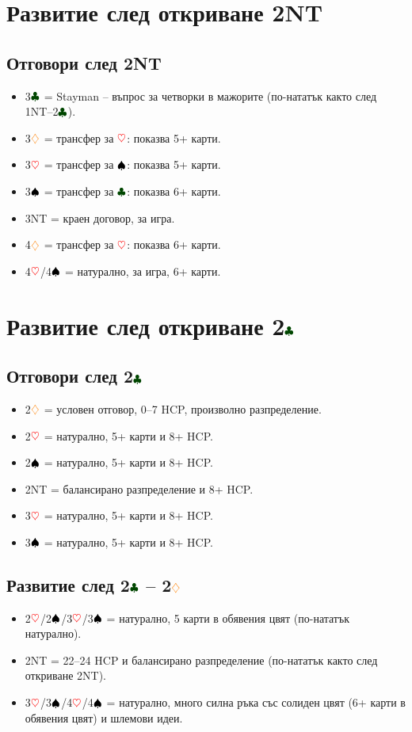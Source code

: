 \documentclass[10pt,a5paper]{extarticle}
\newcommand{\Rheart}{\textcolor{red}{\heartsuit}}
\newcommand{\Rdiamond}{\textcolor{orange}{\diamondsuit}}
\newcommand{\Bspade}{\textcolor{black}{\spadesuit}}
\newcommand{\Bclub}{\textcolor{darkgreen}{\clubsuit}}
\begin{document}
\section{Развитие след откриване 2NT}

\subsection*{Отговори след 2NT}
\begin{itemize}
  \item[] 3$\Bclub$ = Stayman – въпрос за четворки в мажорите  
  (по-нататък както след 1NT–2$\Bclub$).
  \item[] 3$\Rdiamond$ = трансфер за $\Rheart$: показва 5+ карти.
  \item[] 3$\Rheart$ = трансфер за $\Bspade$: показва 5+ карти.
  \item[] 3$\Bspade$ = трансфер за $\Bclub$: показва 6+ карти.
  \item[] 3NT = краен договор, за игра.
  \item[] 4$\Rdiamond$ = трансфер за $\Rheart$: показва 6+ карти.
  \item[] 4$\Rheart$/4$\Bspade$ = натурално, за игра, 6+ карти.
\end{itemize}

\section{Развитие след откриване 2$\Bclub$}

\subsection*{Отговори след 2$\Bclub$}
\begin{itemize}
  \item[] 2$\Rdiamond$ = условен отговор, 0–7 HCP, произволно разпределение.
  \item[] 2$\Rheart$ = натурално, 5+ карти и 8+ HCP.
  \item[] 2$\Bspade$ = натурално, 5+ карти и 8+ HCP.
  \item[] 2NT = балансирано разпределение и 8+ HCP.
  \item[] 3$\Rheart$ = натурално, 5+ карти и 8+ HCP.
  \item[] 3$\Bspade$ = натурално, 5+ карти и 8+ HCP.
\end{itemize}

\subsection*{Развитие след 2$\Bclub$ – 2$\Rdiamond$}
\begin{itemize}
  \item[] 2$\Rheart$/2$\Bspade$/3$\Rheart$/3$\Bspade$ = натурално, 5 карти в обявения цвят (по-нататък натурално).
  \item[] 2NT = 22–24 HCP и балансирано разпределение (по-нататък както след откриване 2NT).
  \item[] 3$\Rheart$/3$\Bspade$/4$\Rheart$/4$\Bspade$ = натурално, много силна ръка със солиден цвят (6+ карти в обявения цвят) и шлемови идеи.
\end{itemize}
\newpage
\end{document}
